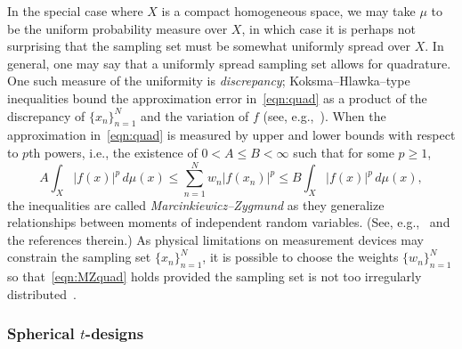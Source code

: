 \documentclass[12pt]{article}
\theoremstyle{plain}
\theoremstyle{definition}
\theoremstyle{remark}
\newcommand{\abs}[1]{\vert#1\vert}
\begin{document}
In the special case where $X$ is a compact homogeneous space, we may take $\mu$ to be the uniform probability measure over $X$, in which case it is perhaps not surprising that the sampling set must be somewhat uniformly spread over $X$.
In general, one may say that a uniformly spread sampling set allows for quadrature.
One such measure of the uniformity is \emph{discrepancy}; Koksma--Hlawka--type inequalities bound the approximation error in~\eqref{eqn:quad} as a product of the discrepancy of $\{x_n\}_{n=1}^N$ and the variation of $f$ (see, e.g.,~\cite{KuipersN:74,GrabnerKT:97}).
When the approximation in~\eqref{eqn:quad} is measured by upper and lower bounds with respect to $p$th powers, i.e., the existence of $0 < A \leq B<\infty$ such that for some $p \geq 1$,
\begin{equation}
\label{eqn:MZquad}
  A \int_X \abs{f(x)}^p \, d\mu(x) \leq \sum_{n=1}^N w_n \abs{f(x_n)}^p \leq B \int_X \abs{f(x)}^p \, d\mu(x),
\end{equation}
the inequalities are called \emph{Marcinkiewicz--Zygmund} as they generalize relationships between moments of independent random variables.
(See, e.g.,~\cite{Lubinsky:98} and the references therein.)
As physical limitations on measurement devices may constrain the sampling set $\{x_n\}_{n=1}^N$, it is possible to choose the weights $\{w_n\}_{n=1}^N$ so that~\eqref{eqn:MZquad} holds provided the sampling set is not too irregularly distributed~\cite{MhaskarNW:01}.

\subsubsection{Spherical $t$-designs}
\end{document}
